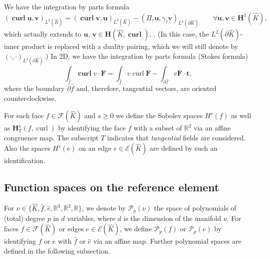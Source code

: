 \documentclass{article}
\begin{document}
We have the integration by parts formula
\begin{equation}
\label{eq:integration-by-parts} 
(\operatorname{\mathbf{curl}} {\mathbf u},{\mathbf v})_{L^2(\widehat K)} = 
(\operatorname{\mathbf{curl}} {\mathbf v},{\mathbf u})_{L^2(\widehat K)} 
- (\Pi_\tau {\mathbf u},\gamma_\tau {\mathbf v})_{L^2(\partial \widehat K)} 
\qquad \forall {\mathbf u}, {\mathbf v} \in {\mathbf H}^1(\widehat K), 
\end{equation}
which actually extends to 
${\mathbf u}$, ${\mathbf v} \in {\mathbf H}(\widehat K,\operatorname{\mathbf{curl}})$, 
\cite[Thm.~{3.29}]{Monkbook}. (In this case, the $L^2(\partial\widehat K)$-inner product is
replaced with a duality pairing, which we will still denote by $(\cdot,\cdot)_{L^2(\partial\widehat K)}$.)
In 2D, we have the integration by parts formula (Stokes formula)
\begin{equation}
\label{eq:2d-stokes}\int_{\widehat f} \operatorname{\mathbf{curl}} v
\cdot{\mathbf{F}} = \int_{\widehat f} v \operatorname{curl}{\mathbf{F}} -
\int_{\partial \widehat f} v {\mathbf{F}} \cdot{\mathbf{t}},%
\end{equation}
where the boundary $\partial\widehat f$ and, therefore, tangential vectors, are oriented counterclockwise.

For each face $f \in {\mathcal F}(\widehat K)$ and $s \ge 0$ we define the Sobolev spaces $H^s(f)$
as well as ${\mathbf H}_T^s(f,\operatorname{curl})$
by identifying the face $f$ with a subset of 
${\mathbb R}^2$ via an affine congruence map. The subscript $T$ indicates that \emph{tangential} fields are considered. 
Also the spaces $H^s(e)$
on an edge $e \in {\mathcal E}(\widehat K)$ are defined by such
an identification.

\subsection{Function spaces on the reference element}
For 
$\nu  \in \{\widehat K, \widehat f, \widehat e, \mathbb{R}^3, \mathbb{R}^2, \mathbb{R}\}$, we denote by 
${\mathcal P}_p(\nu)$ the space of polynomials of (total) degree $p$ 
in $d$ variables, where $d$ is the dimension of the manifold $\nu$. For faces $f \in {\mathcal F}(\widehat K)$ or 
edges $e \in {\mathcal E}(\widehat K)$, we define ${\mathcal P}_p(f)$ or 
${\mathcal P}_p(e)$ by identifying $f$ or $e$ with $\widehat f$ or $\widehat e$
via an affine map. Further polynomial spaces are defined in the following
subsection. 
\end{document}
